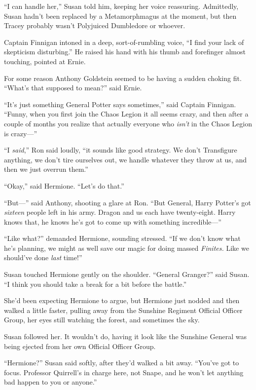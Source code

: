 “I can handle her,” Susan told him, keeping her voice reassuring. Admittedly, Susan hadn’t been replaced by a Metamorphmagus at the moment, but then Tracey probably wasn’t Polyjuiced Dumbledore or whoever.

Captain Finnigan intoned in a deep, sort-of-rumbling voice, “I find your lack of skepticism disturbing.” He raised his hand with his thumb and forefinger almost touching, pointed at Ernie.

For some reason Anthony Goldstein seemed to be having a sudden choking fit. “What’s that supposed to mean?” said Ernie.

“It’s just something General Potter says sometimes,” said Captain Finnigan. “Funny, when you first join the Chaos Legion it all seems crazy, and then after a couple of months you realize that actually everyone who \emph{isn’t} in the Chaos Legion is crazy—”

“I \emph{said},” Ron said loudly, “it sounds like good strategy. We don’t Transfigure anything, we don’t tire ourselves out, we handle whatever they throw at us, and then we just overrun them.”

“Okay,” said Hermione. “Let’s do that.”

“But—” said Anthony, shooting a glare at Ron. “But General, Harry Potter’s got \emph{sixteen} people left in his army. Dragon and us each have twenty-eight. Harry knows that, he knows he’s got to come up with something incredible—”

“Like what?” demanded Hermione, sounding stressed. “If we don’t know what he’s planning, we might as well save our magic for doing massed \emph{Finites.} Like we should’ve done \emph{last} time!”

Susan touched Hermione gently on the shoulder. “General Granger?” said Susan. “I think you should take a break for a bit before the battle.”

She’d been expecting Hermione to argue, but Hermione just nodded and then walked a little faster, pulling away from the Sunshine Regiment Official Officer Group, her eyes still watching the forest, and sometimes the sky.

Susan followed her. It wouldn’t do, having it look like the Sunshine General was being ejected from her own Official Officer Group.

“Hermione?” Susan said softly, after they’d walked a bit away. “You’ve got to focus. Professor Quirrell’s in charge here, not Snape, and he won’t let anything bad happen to you or anyone.”

